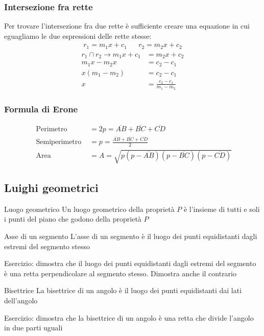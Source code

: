 \subsubsection{Intersezione fra rette}
Per trovare l'intersezione fra due rette è sufficiente creare una equazione in cui eguagliamo le due espressioni delle rette stesse:
\begin{align*}
	r_1 = m_1x + c_1 &  & r_2 = m_2x + c_2
\end{align*}
\begin{align*}
	r_1 \cap r_2 \rightarrow m_1x + c_1 & = m_2x + c_2                  \\
	m_1x - m_2x                         & = c_2 - c_1                   \\
	x \left(m_1 - m_2\right)            & = c_2 - c_1                   \\
	x                                   & = \frac{c_2 - c_1}{m_1 - m_2}
\end{align*}
\subsubsection{Formula di Erone}
\begin{align*}
	\text{ Perimetro }     & = 2p = \overline{AB} + \overline{BC} + \overline{CD}                                                      \\
	\text{ Semiperimetro } & = p = \frac{\overline{AB} + \overline{BC} + \overline{CD}}{2}                                             \\
	\text{ Area }          & = A =\sqrt{p\left(p - \overline{AB}\right) \left(p - \overline{BC} \right)\left(p - \overline{CD}\right)}
\end{align*}

\subsection{Luighi geometrici}
\begin{definizione}{Luogo geometrico}
	Un luogo geometrico della proprietà $ P $ è l'insieme di tutti e soli i punti del piano che godono della proprietà $ P $
\end{definizione}

\begin{definizione}{Asse di un segmento}
	L'asse di un segmento è il luogo dei punti equidistanti dagli estremi del segmento stesso
\end{definizione}
Esercizio: dimostra che il luogo dei punti equidistanti dagli estremi del segmento è una retta perpendicolare al segmento stesso. Dimostra anche il contrario
\begin{definizione}{Bisettrice}
	La bisettrice di un angolo è il luogo dei punti equidistanti dai lati dell'angolo
\end{definizione}
Esercizio: dimostra che la bisettrice di un angolo è una retta che divide l'angolo in due parti uguali


